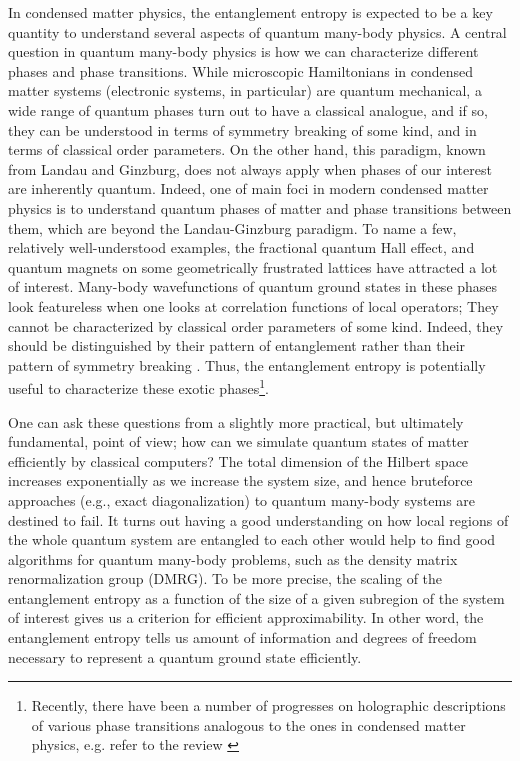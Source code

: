 \documentclass[12pt]{article}
\begin{document}
In condensed matter physics,
the entanglement entropy is expected to be
a key quantity to understand
several aspects of quantum many-body physics.
A central question in quantum many-body physics is
how we can characterize different phases
and phase transitions.
While microscopic Hamiltonians in condensed matter systems
(electronic systems, in particular) are quantum mechanical,
a wide range of quantum phases turn out to have a classical analogue,
and if so, they can be understood in terms of symmetry breaking of some kind,
and in terms of classical order parameters.
On the other hand,
this paradigm, known from Landau and Ginzburg, does not always apply
when phases of our interest are inherently quantum.
Indeed, one of main foci in modern
condensed matter physics is to understand
quantum phases of matter
and
phase transitions between them,
which are beyond the Landau-Ginzburg paradigm.
To name a few, relatively well-understood examples,
the fractional quantum Hall effect,
and quantum magnets on some geometrically frustrated lattices
have attracted a lot of interest.
Many-body wavefunctions of quantum ground states in these phases look
featureless when one looks at correlation functions of local operators;
They cannot be characterized by classical order
parameters of some kind. Indeed, they should be distinguished by
their pattern of entanglement rather than their pattern of symmetry
breaking \cite{Wen89}. Thus, the entanglement entropy is potentially
useful to characterize these exotic phases\footnote{Recently, there have been a number of
progresses on holographic descriptions of various phase transitions analogous to
the ones in condensed matter physics, e.g. refer to the review \cite{HartR}}.

One can ask these questions
from a slightly more practical,
but ultimately fundamental,
point of view;
how can we simulate quantum states of matter efficiently
by classical computers?
The total dimension of the Hilbert space increases exponentially
as we increase the system size,
and hence bruteforce approaches
(e.g., exact diagonalization)
to quantum many-body systems are destined to fail.
It turns out having a good understanding on
how local regions of the whole quantum system are entangled to each other
would help to find good algorithms for quantum many-body problems,
such as the density matrix renormalization group (DMRG)\cite{DMRG}.
To be more precise,
the scaling of the entanglement entropy as a function of the size of
a given subregion of the system of interest
gives us a criterion for efficient approximability.
In other word, the entanglement entropy tells us
amount of information and degrees of freedom necessary to
represent a quantum ground state efficiently.
\end{document}
